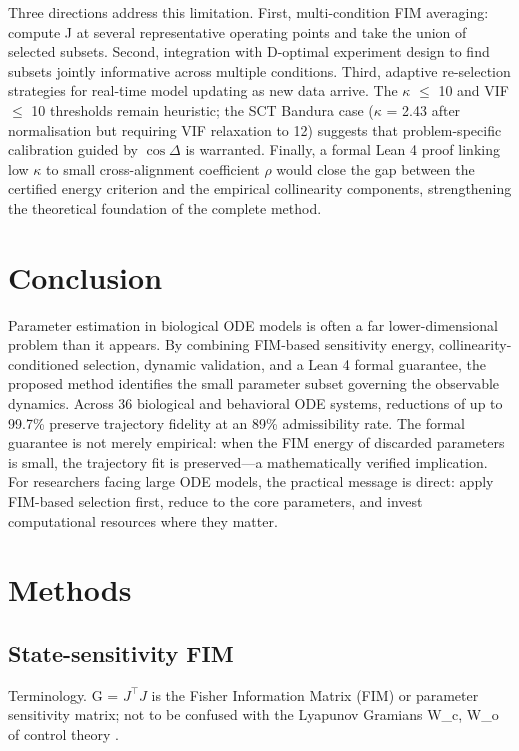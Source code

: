 \documentclass[pdflatex,sn-nature]{sn-jnl}
\begin{document}
Three directions address this limitation. First, multi-condition FIM averaging: compute J at several representative operating points and take the union of selected subsets. Second, integration with D-optimal experiment design \cite{bib28} to find subsets jointly informative across multiple conditions. Third, adaptive re-selection strategies for real-time model updating as new data arrive. The $\kappa$ $\le$ 10 and VIF $\le$ 10 thresholds remain heuristic; the SCT Bandura case ($\kappa$ = 2.43 after normalisation but requiring VIF relaxation to 12) suggests that problem-specific calibration guided by $\cos\Delta$ is warranted. Finally, a formal Lean 4 proof linking low $\kappa$ to small cross-alignment coefficient $\rho$ would close the gap between the certified energy criterion and the empirical collinearity components, strengthening the theoretical foundation of the complete method.


\section{Conclusion}\label{sec:conclusion}


Parameter estimation in biological ODE models is often a far lower-dimensional problem than it appears. By combining FIM-based sensitivity energy, collinearity-conditioned selection, dynamic validation, and a Lean 4 formal guarantee, the proposed method identifies the small parameter subset governing the observable dynamics. Across 36 biological and behavioral ODE systems, reductions of up to 99.7\% preserve trajectory fidelity at an 89\% admissibility rate. The formal guarantee is not merely empirical: when the FIM energy of discarded parameters is small, the trajectory fit is preserved---a mathematically verified implication. For researchers facing large ODE models, the practical message is direct: apply FIM-based selection first, reduce to the core parameters, and invest computational resources where they matter.


\section{Methods}\label{sec:methods}


\subsection{State-sensitivity FIM}\label{sec:fim}


Terminology. G = $J^\top J$ is the Fisher Information Matrix (FIM) or parameter sensitivity matrix; not to be confused with the Lyapunov Gramians W\_c, W\_o of control theory \cite{bib30}.
\end{document}
